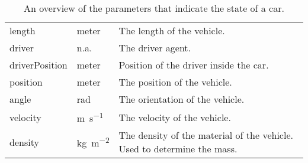 \begin{table}
\begin{tabularx}{\textwidth}{>{\ttfamily}llX}
		length 					
			& \si{meter} 
			& The length of the vehicle. \\ 
		driver 					
			& n.a. 
			& The driver agent. \\
		driverPosition
			& \si{meter}
			& Position of the driver inside the car. \\
		position
			& \si{meter}
			& The position of the vehicle. \\
		angle
			& \si{\radian}
			& The orientation of the vehicle. \\
		velocity
			& \si{\meter\per\second}
			& The velocity of the vehicle. \\
		density
			& \si{\kg\per\square\meter}
			& The density of the material of the vehicle. Used to determine the mass. \\
		\bottomrule
	\end{tabularx}
	\caption{An overview of the parameters that indicate the state of a car.}
	\label{tab:par:method:model:overview:state:lowlevel:car}
\end{table}

